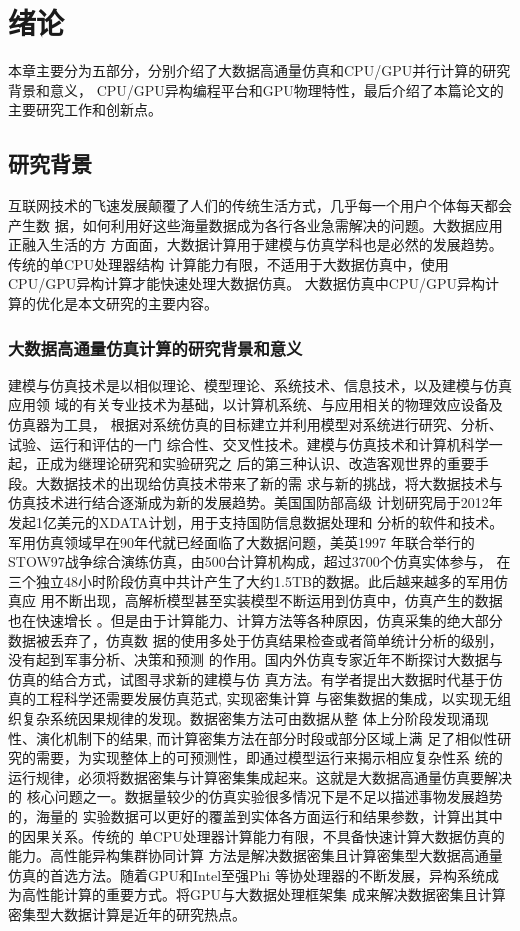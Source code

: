 \chapter{绪论}
本章主要分为五部分，分别介绍了大数据高通量仿真和CPU/GPU并行计算的研究背景和意义，
CPU/GPU异构编程平台和GPU物理特性，最后介绍了本篇论文的主要研究工作和创新点。
\label{chap:intro}
\section{研究背景}
互联网技术的飞速发展颠覆了人们的传统生活方式，几乎每一个用户个体每天都会产生数
据，如何利用好这些海量数据成为各行各业急需解决的问题。大数据应用正融入生活的方
方面面，大数据计算用于建模与仿真学科也是必然的发展趋势。传统的单CPU处理器结构
计算能力有限，不适用于大数据仿真中，使用CPU/GPU异构计算才能快速处理大数据仿真。
大数据仿真中CPU/GPU异构计算的优化是本文研究的主要内容。

\subsection{大数据高通量仿真计算的研究背景和意义}
建模与仿真技术是以相似理论、模型理论、系统技术、信息技术，以及建模与仿真应用领
域的有关专业技术为基础，以计算机系统、与应用相关的物理效应设备及仿真器为工具，
根据对系统仿真的目标建立并利用模型对系统进行研究、分析、试验、运行和评估的一门
综合性、交叉性技术。建模与仿真技术和计算机科学一起，正成为继理论研究和实验研究之
后的第三种认识、改造客观世界的重要手段。大数据技术的出现给仿真技术带来了新的需
求与新的挑战，将大数据技术与仿真技术进行结合逐渐成为新的发展趋势。美国国防部高级
计划研究局于2012年发起1亿美元的XDATA计划，用于支持国防信息数据处理和
分析的软件和技术。军用仿真领域早在90年代就已经面临了大数据问题，美英1997
年联合举行的STOW97战争综合演练仿真，由500台计算机构成，超过3700个仿真实体参与，
在三个独立48小时阶段仿真中共计产生了大约1.5TB的数据。此后越来越多的军用仿真应
用不断出现，高解析模型甚至实装模型不断运用到仿真中，仿真产生的数据也在快速增长
。但是由于计算能力、计算方法等各种原因，仿真采集的绝大部分数据被丢弃了，仿真数
据的使用多处于仿真结果检查或者简单统计分析的级别，没有起到军事分析、决策和预测
的作用。国内外仿真专家近年不断探讨大数据与仿真的结合方式，试图寻求新的建模与仿
真方法。有学者提出大数据时代基于仿真的工程科学还需要发展仿真范式, 实现密集计算
与密集数据的集成，以实现无组织复杂系统因果规律的发现。数据密集方法可由数据从整
体上分阶段发现涌现性、演化机制下的结果, 而计算密集方法在部分时段或部分区域上满
足了相似性研究的需要，为实现整体上的可预测性，即通过模型运行来揭示相应复杂性系
统的运行规律，必须将数据密集与计算密集集成起来。这就是大数据高通量仿真要解决的
核心问题之一。数据量较少的仿真实验很多情况下是不足以描述事物发展趋势的，海量的
实验数据可以更好的覆盖到实体各方面运行和结果参数，计算出其中的因果关系。传统的
单CPU处理器计算能力有限，不具备快速计算大数据仿真的能力。高性能异构集群协同计算
方法是解决数据密集且计算密集型大数据高通量仿真的首选方法。随着GPU和Intel至强Phi
等协处理器的不断发展，异构系统成为高性能计算的重要方式。将GPU与大数据处理框架集
成来解决数据密集且计算密集型大数据计算是近年的研究热点。

